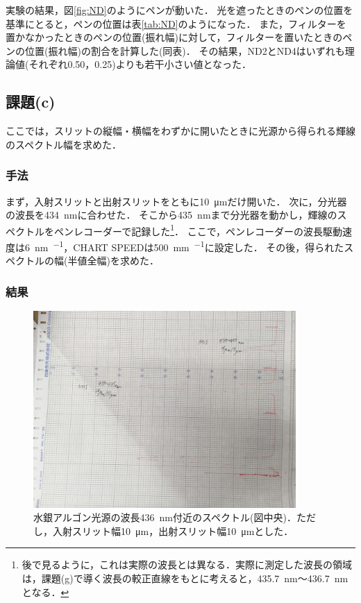 \documentclass[titlepage]{jsarticle}
\begin{document}
実験の結果，図\ref{fig:ND}のようにペンが動いた．
光を遮ったときのペンの位置を基準にとると，ペンの位置は表\ref{tab:ND}のようになった．
また，フィルターを置かなかったときのペンの位置(振れ幅)に対して，フィルターを置いたときのペンの位置(振れ幅)の割合を計算した(同表)．
その結果，ND2とND4はいずれも理論値(それぞれ0.50，0.25)よりも若干小さい値となった．

\subsection{課題(c)}
ここでは，スリットの縦幅・横幅をわずかに開いたときに光源から得られる輝線のスペクトル幅を求めた．

\subsubsection{手法}
まず，入射スリットと出射スリットをともに\SI{10}{\um}だけ開いた．
次に，分光器の波長を\SI{434}{\nm}に合わせた．
そこから\SI{435}{\nm}まで分光器を動かし，輝線のスペクトルをペンレコーダーで記録した\footnote{後で見るように，これは実際の波長とは異なる．実際に測定した波長の領域は，課題(g)で導く波長の較正直線をもとに考えると，\SI{435.7}{\nm}～\SI{436.7}{\nm}となる．}．
ここで，ペンレコーダーの波長駆動速度は\SI{6}{\nm\per\min}，CHART SPEEDは\SI{500}{\mm\per\min}に設定した．
その後，得られたスペクトルの幅(半値全幅)を求めた．

\subsubsection{結果}
\begin{figure}[htbp]
  \centering
  \includegraphics[width=10cm]{c_delta_min.JPG}
  \caption{水銀アルゴン光源の波長\SI{436}{\nm}付近のスペクトル(図中央)．ただし，入射スリット幅\SI{10}{\um}，出射スリット幅\SI{10}{\um}とした．}
  \label{fig:delta_min}
\end{figure}
\end{document}
